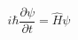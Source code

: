 \documentclass[preview]{standalone}
\begin{document}
\begin{center}
$$i \hbar \frac{\displaystyle \partial \psi}{\displaystyle \partial t} = \hat{H} \psi$$
\end{center}
\end{document}
